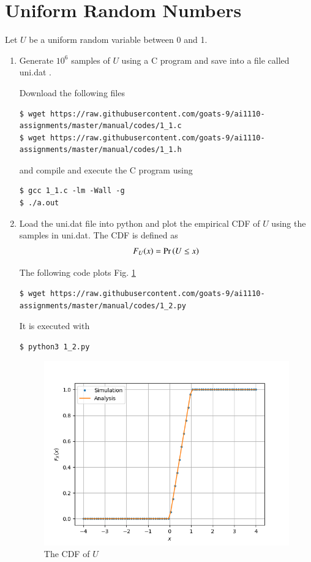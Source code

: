 \documentclass[journal,12pt,twocolumn]{IEEEtran}
\renewcommand\thesection{\arabic{section}}
\begin{document}
\section{Uniform Random Numbers}
Let $U$ be a uniform random variable between 0 and 1.
\begin{enumerate}[label=\thesection.\arabic*
,ref=\thesection.\theenumi]
\item Generate $10^6$ samples of $U$ using a C program and save into a file called uni.dat .

\solution Download the following files
\begin{lstlisting}
$ wget https://raw.githubusercontent.com/goats-9/ai1110-assignments/master/manual/codes/1_1.c
$ wget https://raw.githubusercontent.com/goats-9/ai1110-assignments/master/manual/codes/1_1.h
\end{lstlisting}
and compile and execute the C program using
\begin{lstlisting}
$ gcc 1_1.c -lm -Wall -g
$ ./a.out
\end{lstlisting}

%
\item
Load the uni.dat file into python and plot the empirical CDF of $U$ using the samples in uni.dat. The CDF is defined as
\begin{align}
F_{U}(x) = \Pr\left(U \leq x\right)
\end{align}

\solution  The following code plots Fig. \ref{fig:uni_cdf}
\begin{lstlisting}
$ wget https://raw.githubusercontent.com/goats-9/ai1110-assignments/master/manual/codes/1_2.py
\end{lstlisting}
It is executed with
\begin{lstlisting}
$ python3 1_2.py
\end{lstlisting}
\begin{figure}
\centering
\includegraphics[width=\columnwidth]{./figs/1_2.png}
\caption{The CDF of $U$}
\label{fig:uni_cdf}
\end{figure}


\end{enumerate}
\end{document}
